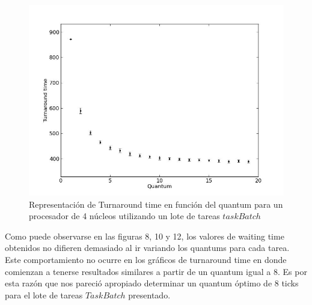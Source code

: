 \begin{figure}[H]
	\begin{center}
		  \includegraphics[scale=0.3]{graficos/cores_4_ta.jpg}
		  \caption{Representación de Turnaround time en función del quantum para un procesador de 4 núcleos utilizando un lote de tareas $taskBatch$}
		  \label{fig:contra1}
	\end{center}
\end{figure}

Como puede observarse en las figuras 8, 10 y 12, los valores de waiting time obtenidos no difieren demasiado al ir variando los quantums para cada tarea. Este comportamiento no ocurre en los gráficos de turnaround time en donde comienzan a tenerse resultados similares a partir de un quantum igual a 8. Es por esta razón que nos pareció apropiado determinar un quantum óptimo de 8 ticks para el lote de tareas $TaskBatch$ presentado.



